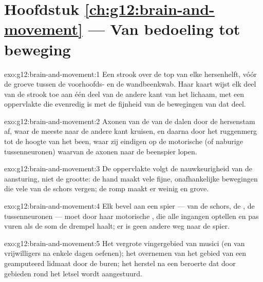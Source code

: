 \section*{Hoofdstuk \ref{ch:g12:brain-and-movement} --- Van bedoeling tot beweging}

\begin{solution}{exo:g12:brain-and-movement:1}
Een strook over de top van elke hersenhelft, vóór de groeve tussen de
voorhoofds- en de wandbeenkwab. Haar kaart wijst elk deel van de strook
toe aan één deel van de andere kant van het lichaam, met een oppervlakte
die evenredig is met de fijnheid van de bewegingen van dat deel.
\end{solution}

\begin{solution}{exo:g12:brain-and-movement:2}
Axonen van de  van de  dalen door de hersenstam
af, waar de meeste naar de andere kant kruisen, en daarna door het
ruggenmerg tot de hoogte van het been, waar zij eindigen op de motorische
 (of naburige tussenneuronen) waarvan de axonen naar de beenspier
lopen.
\end{solution}

\begin{solution}{exo:g12:brain-and-movement:3}
De oppervlakte volgt de nauwkeurigheid van de aansturing, niet de grootte:
de hand maakt vele fijne, onafhankelijke bewegingen die vele  van
de schors vergen; de romp maakt er weinig en grove.
\end{solution}

\begin{solution}{exo:g12:brain-and-movement:4}
Elk bevel aan een spier --- van de schors, de , de
tussenneuronen --- moet door haar motorische , die alle ingangen
optellen en pas vuren als de som de drempel haalt; er is geen andere weg
naar de spier.
\end{solution}

\begin{solution}{exo:g12:brain-and-movement:5}
Het vergrote vingergebied van musici (en van vrijwilligers na enkele dagen
oefenen); het overnemen van het gebied van een geamputeerd lidmaat door de
buren; het herstel na een beroerte dat door gebieden rond het letsel wordt
aangestuurd.
\end{solution}

